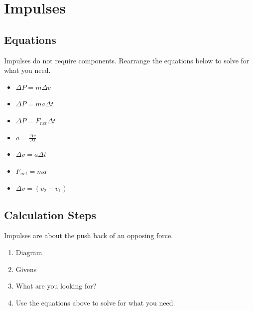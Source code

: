 \documentclass{article}
\begin{document}
\section{Impulses}
\begin{adjustwidth}{1cm}{0pt}
    \subsection*{Equations}
    \begin{flushleft}
        Impulses do not require components. Rearrange the equations below to solve for what you need.
    \end{flushleft}
    \vspace*{7pt}
    \noindent
    \begin{minipage}{0.33\textwidth}
        \begin{itemize}
            \item $\Delta P = m\Delta v$
            \item $\Delta P = ma\Delta t$
            \item $\Delta P = F_{net}\Delta t$
        \end{itemize}
    \end{minipage}
    \begin{minipage}{0.33\textwidth}
        \begin{itemize}
            \item $a = \frac{\Delta v}{\Delta t}$
            \item $\Delta v = a \Delta t$
            \item $F_{net} = ma$
            \item $\Delta v = (v_{2} - v_{1})$
        \end{itemize}
    \end{minipage}
    \subsection*{Calculation Steps}
    \begin{flushleft}
        Impulses are about the push back of an opposing force.
    \end{flushleft}
    \vspace*{5pt}
    \begin{adjustwidth}{0.5cm}{0pt}
        \begin{enumerate}
            \item Diagram
            \item Givens
            \item What are you looking for?
            \item Use the equations above to solve for what you need.
        \end{enumerate}
    \end{adjustwidth}
\end{adjustwidth}
\end{document}
